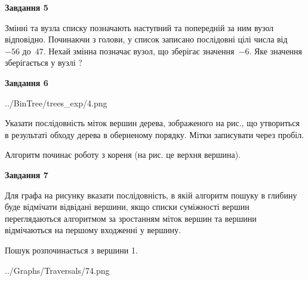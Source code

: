 \documentclass[12pt, ukrainian]{article}
\begin{document}
{\begin {large}
{\begin {center}\textbf{Завдання 5}\end {center}}\par
Змінні  та  вузла списку позначають наступний та попередній за ним вузол відповідно. Починаючи з голови, у список записано послідовні цілі числа від~$-56$ до~$47$. Нехай змінна  позначає вузол, що зберігає значення~$-6$.
Яке значення зберігається у вузлі  ?\par
\newpage

{\begin {center}\textbf{Завдання 6}\end {center}}\par

\begin{center}
	{../BinTree/trees_exp/4.png}
\end{center}
Указати послідовність міток вершин дерева, зображеного на рис., що утвориться в результаті обходу дерева в оберненому порядку. Мітки записувати через пробіл.\par Алгоритм починає роботу з кореня (на рис. це верхня вершина).\par
\newpage

{\begin {center}\textbf{Завдання 7}\end {center}}\par
Для графа на рисунку вказати послідовність, в якій алгоритм пошуку в глибину буде відмічати відвідані вершини, якщо списки суміжності вершин переглядаються алгоритмом за зростанням міток вершин та вершини відмічаються на першому вход\-женні у вершину.\par
Пошук розпочинається з вершини 1.\par

\begin{center}
	{../Graphs/Traversals/74.png}
\end{center}\par
\newpage


\end{large}}
\end{document}
